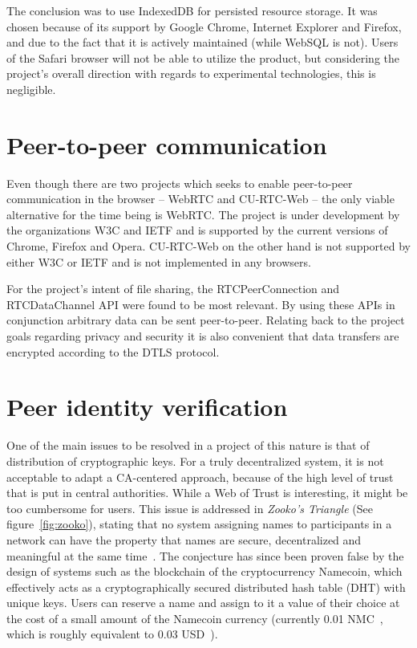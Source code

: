 The conclusion was to use IndexedDB for persisted resource storage. It was chosen because of its support by Google Chrome, Internet Explorer and Firefox, and due to the fact that it is actively maintained (while WebSQL is not). Users of the Safari browser will not be able to utilize the product, but considering the project's overall direction with regards to experimental technologies, this is negligible.

\section{Peer-to-peer communication}

Even though there are two projects which seeks to enable peer-to-peer communication in the browser – WebRTC and CU-RTC-Web – the only viable alternative for the time being is WebRTC. The project is under development by the organizations W3C and IETF and is supported by the current versions of Chrome, Firefox and Opera. CU-RTC-Web on the other hand is not supported by either W3C or IETF and is not implemented in any browsers.

For the project's intent of file sharing, the RTCPeerConnection and RTCDataChannel API were found to be most relevant. By using these APIs in conjunction arbitrary data can be sent peer-to-peer. Relating back to the project goals regarding privacy and security it is also convenient that data transfers are encrypted according to the DTLS protocol.

\section{Peer identity verification}
\label{sec:authorization}
One of the main issues to be resolved in a project of this nature is that of distribution of cryptographic keys. For a truly decentralized system, it is not acceptable to adapt a CA-centered approach, because of the high level of trust that is put in central authorities. While a Web of Trust is interesting, it might be too cumbersome for users. This issue is addressed in \emph{Zooko's Triangle} (See figure~\ref{fig:zooko}), stating that no system assigning names to participants in a network can have the property that names are secure, decentralized and meaningful at the same time~\cite{Zooko:2001:Online}. The conjecture has since been proven false by the design of systems such as the blockchain of the cryptocurrency Namecoin, which effectively acts as a cryptographically secured distributed hash table (DHT) with unique keys. Users can reserve a name and assign to it a value of their choice at the cost of a small amount of the Namecoin currency (currently 0.01 NMC~\cite{Namecoin:2014:Online}, which is roughly equivalent to 0.03 USD~\cite{CryptoCoinCharts:2014:Online}).

